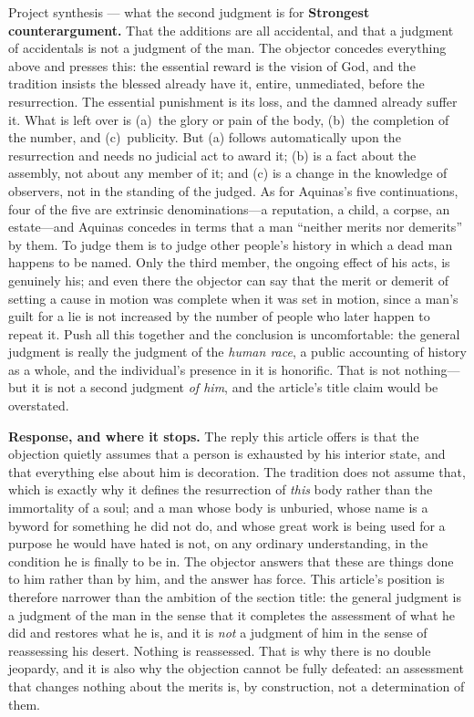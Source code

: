 \begin{studybox}{Project synthesis --- what the second judgment is for}
\textbf{Strongest counterargument.} That the additions are all accidental, and that a judgment of accidentals is not a judgment of the man. The objector concedes everything above and presses this: the essential reward is the vision of God, and the tradition insists the blessed already have it, entire, unmediated, before the resurrection. The essential punishment is its loss, and the damned already suffer it. What is left over is (a)~the glory or pain of the body, (b)~the completion of the number, and (c)~publicity. But (a) follows automatically upon the resurrection and needs no judicial act to award it; (b) is a fact about the assembly, not about any member of it; and (c) is a change in the knowledge of observers, not in the standing of the judged. As for Aquinas's five continuations, four of the five are extrinsic denominations---a reputation, a child, a corpse, an estate---and Aquinas concedes in terms that a man ``neither merits nor demerits'' by them. To judge them is to judge other people's history in which a dead man happens to be named. Only the third member, the ongoing effect of his acts, is genuinely his; and even there the objector can say that the merit or demerit of setting a cause in motion was complete when it was set in motion, since a man's guilt for a lie is not increased by the number of people who later happen to repeat it. Push all this together and the conclusion is uncomfortable: the general judgment is really the judgment of the \emph{human race}, a public accounting of history as a whole, and the individual's presence in it is honorific. That is not nothing---but it is not a second judgment \emph{of him}, and the article's title claim would be overstated.

\textbf{Response, and where it stops.} The reply this article offers is that the objection quietly assumes that a person is exhausted by his interior state, and that everything else about him is decoration. The tradition does not assume that, which is exactly why it defines the resurrection of \emph{this} body rather than the immortality of a soul; and a man whose body is unburied, whose name is a byword for something he did not do, and whose great work is being used for a purpose he would have hated is not, on any ordinary understanding, in the condition he is finally to be in. The objector answers that these are things done to him rather than by him, and the answer has force. This article's position is therefore narrower than the ambition of the section title: the general judgment is a judgment of the man in the sense that it completes the assessment of what he did and restores what he is, and it is \emph{not} a judgment of him in the sense of reassessing his desert. Nothing is reassessed. That is why there is no double jeopardy, and it is also why the objection cannot be fully defeated: an assessment that changes nothing about the merits is, by construction, not a determination of them.


\end{studybox}
